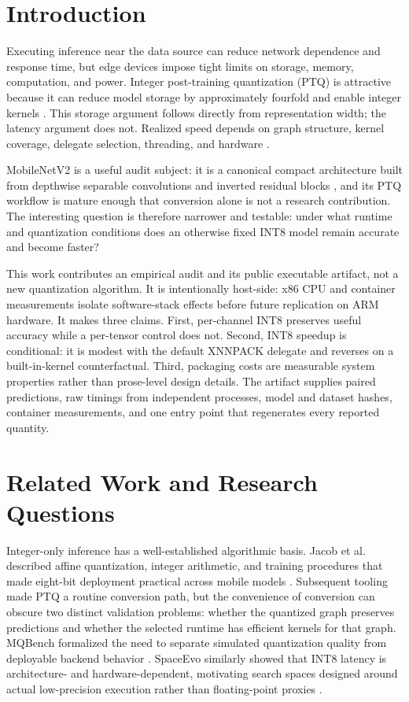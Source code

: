 \section{Introduction}
\label{sec:intro}

Executing inference near the data source can reduce network dependence and response time, but edge devices impose tight limits on storage, memory, computation, and power. Integer post-training quantization (PTQ) is attractive because it can reduce model storage by approximately fourfold and enable integer kernels \cite{jacob2018quantization,tflite_integer}. This storage argument follows directly from representation width; the latency argument does not. Realized speed depends on graph structure, kernel coverage, delegate selection, threading, and hardware \cite{reddi2020mlperf,li2021mqbench,wang2023spaceevo}.

MobileNetV2 is a useful audit subject: it is a canonical compact architecture built from depthwise separable convolutions and inverted residual blocks \cite{sandler2018mobilenetv2}, and its PTQ workflow is mature enough that conversion alone is not a research contribution. The interesting question is therefore narrower and testable: under what runtime and quantization conditions does an otherwise fixed INT8 model remain accurate and become faster?

This work contributes an empirical audit and its public executable artifact, not a new quantization algorithm. It is intentionally host-side: x86 CPU and container measurements isolate software-stack effects before future replication on ARM hardware. It makes three claims. First, per-channel INT8 preserves useful accuracy while a per-tensor control does not. Second, INT8 speedup is conditional: it is modest with the default XNNPACK delegate and reverses on a built-in-kernel counterfactual. Third, packaging costs are measurable system properties rather than prose-level design details. The artifact supplies paired predictions, raw timings from independent processes, model and dataset hashes, container measurements, and one entry point that regenerates every reported quantity.

\section{Related Work and Research Questions}

Integer-only inference has a well-established algorithmic basis. Jacob et al. described affine quantization, integer arithmetic, and training procedures that made eight-bit deployment practical across mobile models \cite{jacob2018quantization}. Subsequent tooling made PTQ a routine conversion path, but the convenience of conversion can obscure two distinct validation problems: whether the quantized graph preserves predictions and whether the selected runtime has efficient kernels for that graph. MQBench formalized the need to separate simulated quantization quality from deployable backend behavior \cite{li2021mqbench}. SpaceEvo similarly showed that INT8 latency is architecture- and hardware-dependent, motivating search spaces designed around actual low-precision execution rather than floating-point proxies \cite{wang2023spaceevo}.

